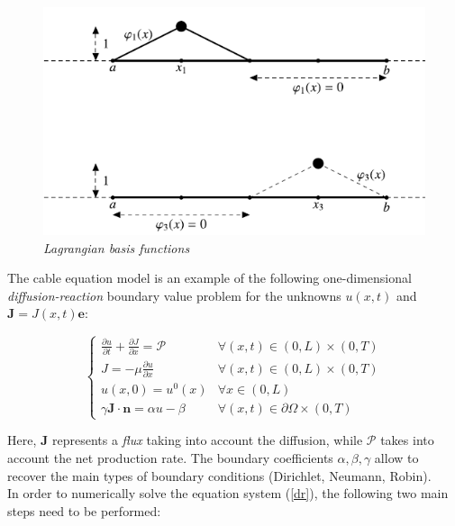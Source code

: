 \documentclass[12pt, a4paper]{report}
\begin{document}
\begin{figure}[H]
	\begin{center}
		
		\includegraphics[scale=0.7]{basis.png} 
	\end{center} 
	\caption{\textit{Lagrangian basis functions}}
	\label{Lagrangian}
\end{figure}


The cable equation model is an example of the following one-dimensional \textit{diffusion-reaction} boundary value problem for the unknowns $ u(x,t)$ and $\textbf{J} = J(x,t)\textbf{e}$:


\begin{equation}
\begin{cases}
\displaystyle \frac{\partial u}{\partial t} + \displaystyle \frac{\partial J}{\partial x} = \mathcal{P} & \forall (x,t) \in (0,L) \times (0,T)  \\[1em]
J = - \displaystyle \mu \frac{\partial u}{\partial x} & \forall (x,t) \in (0,L) \times (0,T)\\[1em]
u(x,0) = u^0(x) & \forall x \in (0,L)  \\
\gamma \textbf{J} \cdot \textbf{n} = \alpha u - \beta &  \forall (x,t) \in \partial \Omega \times (0,T)  
\end{cases} \label{dr}
\end{equation}

Here, $\textbf{J}$  represents a \textit{flux} taking into account the diffusion, while $\mathcal{P}$ takes into account the  net production rate. The boundary coefficients $\alpha, \beta, \gamma$ allow to recover the main types of boundary conditions (Dirichlet, Neumann, Robin).\\
In order to numerically solve the equation system (\ref{dr}), the following two main steps need to be performed:
\end{document}
